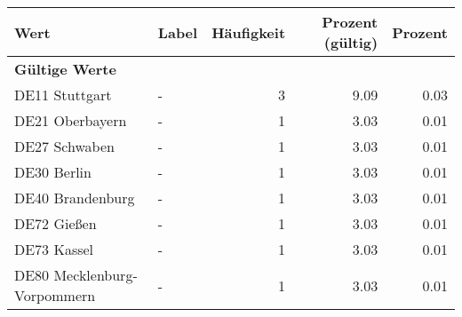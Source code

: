     \begin{longtable}{Xlrrr}
     \toprule
     \textbf{Wert} & \textbf{Label} & \textbf{Häufigkeit} & \textbf{Prozent (gültig)} & \textbf{Prozent} \\
     \endhead
     \midrule
     \multicolumn{5}{l}{\textbf{Gültige Werte}}\\

     \multicolumn{1}{X}{DE11 Stuttgart} &
     - &
     \num{3} &
     \num[round-mode=places,round-precision=2]{9.09} &
     \num[round-mode=places,round-precision=2]{0.03} \\

     \multicolumn{1}{X}{DE21 Oberbayern} &
     - &
     \num{1} &
     \num[round-mode=places,round-precision=2]{3.03} &
     \num[round-mode=places,round-precision=2]{0.01} \\

     \multicolumn{1}{X}{DE27 Schwaben} &
     - &
     \num{1} &
     \num[round-mode=places,round-precision=2]{3.03} &
     \num[round-mode=places,round-precision=2]{0.01} \\

     \multicolumn{1}{X}{DE30 Berlin} &
     - &
     \num{1} &
     \num[round-mode=places,round-precision=2]{3.03} &
     \num[round-mode=places,round-precision=2]{0.01} \\

     \multicolumn{1}{X}{DE40 Brandenburg} &
     - &
     \num{1} &
     \num[round-mode=places,round-precision=2]{3.03} &
     \num[round-mode=places,round-precision=2]{0.01} \\

     \multicolumn{1}{X}{DE72 Gießen} &
     - &
     \num{1} &
     \num[round-mode=places,round-precision=2]{3.03} &
     \num[round-mode=places,round-precision=2]{0.01} \\

     \multicolumn{1}{X}{DE73 Kassel} &
     - &
     \num{1} &
     \num[round-mode=places,round-precision=2]{3.03} &
     \num[round-mode=places,round-precision=2]{0.01} \\

     \multicolumn{1}{X}{DE80 Mecklenburg-Vorpommern} &
     - &
     \num{1} &
     \num[round-mode=places,round-precision=2]{3.03} &
     \num[round-mode=places,round-precision=2]{0.01} \\


\end{longtable}
